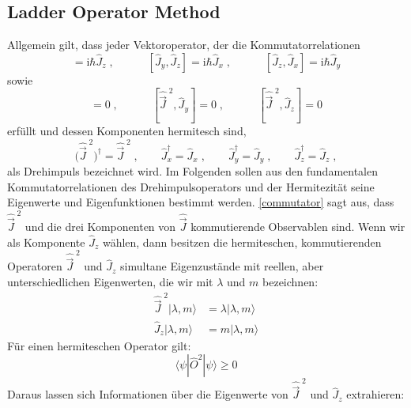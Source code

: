 \documentclass[9pt]{report}
\begin{document}
\subsection{Ladder Operator Method}
Allgemein gilt, dass jeder Vektoroperator, der die Kommutatorrelationen
\begin{equation}
[\hat{J}_x,\hat{J}_y]=\mathrm{i}\hbar\hat{J}_z\;,\qquad\quad[\hat{J}_y,\hat{J}_z]=\mathrm{i}\hbar\hat{J}_x\;,\qquad\quad[\hat{J}_z,\hat{J}_x]=\mathrm{i}\hbar\hat{J}_y
\end{equation}
sowie
\begin{equation}
[\hat{\vec{J}}^{\;2},\hat{J}_x]=0\;,\qquad\quad[\hat{\vec{J}}^{\;2},\hat{J}_y]=0\;,\qquad\quad[\hat{\vec{J}}^{\;2},\hat{J}_z]=0\label{commutator}
\end{equation}
erfüllt und dessen Komponenten hermitesch sind,
\begin{equation}
\big(\hat{\vec{J}}^{\;2}\big)^{\dagger}=\hat{\vec{J}}^{\;2}\;,\qquad\hat{J}^{\dagger}_{x}=\hat{J}_{x}\;,\qquad\hat{J}^{\dagger}_{y}=\hat{J}_{y}\;,\qquad\hat{J}^{\dagger}_{z}=\hat{J}_{z}\;,
\end{equation}
als Drehimpuls bezeichnet wird. Im Folgenden sollen aus den fundamentalen Kommutatorrelationen des Drehimpulsoperators und der Hermitezität seine Eigenwerte und Eigenfunktionen bestimmt werden. \eqref{commutator} sagt aus, dass $\hat{\vec{J}}^{\;2}$ und die drei Komponenten von $\hat{\vec{J}}$ kommutierende Observablen sind. Wenn wir als Komponente $\hat{J}_z$ wählen, dann besitzen die hermiteschen, kommutierenden Operatoren $\hat{\vec{J}}^{\;2}$ und $\hat{J}_z$ simultane Eigenzustände mit reellen, aber unterschiedlichen Eigenwerten, die wir mit $\lambda$ und $m$ bezeichnen:
\begin{align}
\hat{\vec{J}}^{\;2}|\lambda,m\rangle &= \lambda|\lambda,m\rangle\label{Eigenwert1}\\
\hat{J}_{z}|\lambda,m\rangle &= m|\lambda,m\rangle\label{Eigenwert2}
\end{align}
Für einen hermiteschen Operator gilt:
\begin{equation}
\langle\psi|\hat{O}^{2}|\psi\rangle\geq 0
\end{equation}
Daraus lassen sich Informationen über die Eigenwerte von $\hat{\vec{J}}^{\;2}$ und $\hat{J}_z$ extrahieren:
\end{document}
